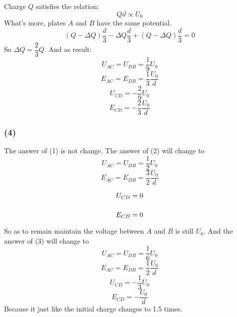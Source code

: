 \documentclass[a4paper,11pt]{amsart}
\theoremstyle{definition}
\begin{document}
\begin{center}
\begin{tikzpicture}[x=0.75pt,y=0.75pt,yscale=-1,xscale=1]
			
		\end{tikzpicture}
		
	\end{center}
	 	Charge $Q$ satisfies the relation:
	 	$$
	 	Qd\propto U_0
	 	$$
	 	What's more, plates $A$ and $B$ have the same potential.
	 	$$
	 	\left( Q-\Delta Q \right) \frac{d}{3}-\Delta Q\frac{d}{3}+\left( Q-\Delta Q \right) \frac{d}{3}=0
	 	$$
	 	So $\Delta Q=\dfrac{2}{3}Q.$ And as result:
	 	$$
	 	U_{AC}=U_{DB}=\frac{1}{9}U_0
	 	$$
	 	$$
	 	E_{AC}=E_{DB}=\frac{1}{3}\frac{U_0}{d}
	 	$$
	 	$$
	 	U_{CD}=-\frac{2}{9}U_0
	 	$$
	 	$$
	 	E_{CD}=-\frac{2}{3}\frac{U_0}{d}
	 	$$
	\subsubsection*{(4)}
	The answer of (1) is not change. The answer of (2) will change to
	$$
	U_{AC}=U_{DB}=\frac{1}{2}U_0
	$$
	$$
	E_{AC}=E_{DB}=\frac{3}{2}\frac{U_0}{d}
	$$
	$$
	U_{CD}=0\vphantom{\frac{1}{3}U_0}
	$$
	$$
	E_{CD}=0\vphantom{\frac{U_0}{d}}
	$$
	So as to remain maintain the voltage between $A$ and $B$ is still $U_0$. And the answer of (3) will change to
	$$
	U_{AC}=U_{DB}=\frac{1}{6}U_0
	$$
	$$
	E_{AC}=E_{DB}=\frac{1}{2}\frac{U_0}{d}
	$$
	$$
	U_{CD}=-\frac{1}{3}U_0
	$$
	$$
	E_{CD}=-\frac{U_0}{d}
	$$
	Because it just like the initial charge changes to 1.5 times.
\end{document}
